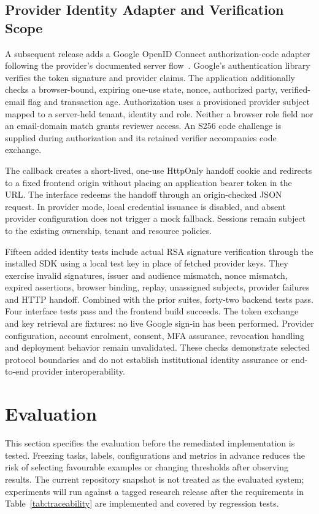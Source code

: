 \documentclass[conference]{IEEEtran}
\begin{document}
\subsection{Provider Identity Adapter and Verification Scope}

A subsequent release adds a Google OpenID Connect authorization-code adapter following the provider's documented server flow~\cite{google_oidc}. Google's authentication library verifies the token signature and provider claims. The application additionally checks a browser-bound, expiring one-use state, nonce, authorized party, verified-email flag and transaction age. Authorization uses a provisioned provider subject mapped to a server-held tenant, identity and role. Neither a browser role field nor an email-domain match grants reviewer access. An S256 code challenge is supplied during authorization and its retained verifier accompanies code exchange.

The callback creates a short-lived, one-use HttpOnly handoff cookie and redirects to a fixed frontend origin without placing an application bearer token in the URL. The interface redeems the handoff through an origin-checked JSON request. In provider mode, local credential issuance is disabled, and absent provider configuration does not trigger a mock fallback. Sessions remain subject to the existing ownership, tenant and resource policies.

Fifteen added identity tests include actual RSA signature verification through the installed SDK using a local test key in place of fetched provider keys. They exercise invalid signatures, issuer and audience mismatch, nonce mismatch, expired assertions, browser binding, replay, unassigned subjects, provider failures and HTTP handoff. Combined with the prior suites, forty-two backend tests pass. Four interface tests pass and the frontend build succeeds. The token exchange and key retrieval are fixtures: no live Google sign-in has been performed. Provider configuration, account enrolment, consent, MFA assurance, revocation handling and deployment behavior remain unvalidated. These checks demonstrate selected protocol boundaries and do not establish institutional identity assurance or end-to-end provider interoperability.

\section{Evaluation}

This section specifies the evaluation before the remediated implementation is tested. Freezing tasks, labels, configurations and metrics in advance reduces the risk of selecting favourable examples or changing thresholds after observing results. The current repository snapshot is not treated as the evaluated system; experiments will run against a tagged research release after the requirements in Table~\ref{tab:traceability} are implemented and covered by regression tests.
\end{document}
